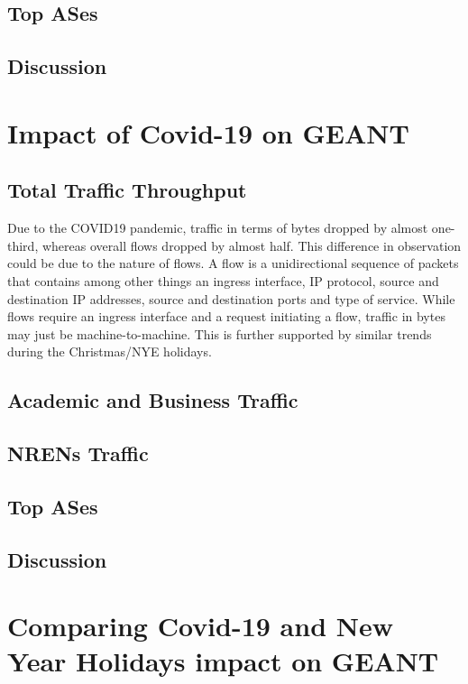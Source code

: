 \documentclass[10pt, journal, letterpaper]{IEEEtran}
\begin{document}
\subsection{Top ASes}

\subsection{Discussion}



\section{Impact of Covid-19 on GEANT}

\subsection{Total Traffic Throughput}
Due to the COVID19 pandemic, traffic in terms of bytes dropped by almost one-third, whereas overall flows dropped by almost half. This difference in observation could be due to the nature of flows. A flow is a unidirectional sequence of packets that contains among other things an ingress interface, IP protocol, source and destination IP addresses, source and destination ports and type of service. While flows require an ingress interface and a request initiating a flow, traffic in bytes may just be machine-to-machine. This is further supported by similar trends during the Christmas/NYE holidays.

\subsection{Academic and Business Traffic}

\subsection{NRENs Traffic}

\subsection{Top ASes}

\subsection{Discussion}

\section{Comparing Covid-19 and New Year Holidays impact on GEANT}
\end{document}
